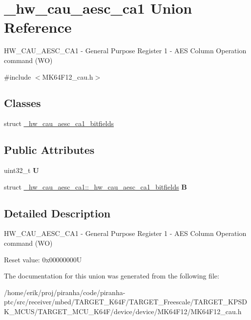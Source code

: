 \hypertarget{union__hw__cau__aesc__ca1}{}\section{\+\_\+hw\+\_\+cau\+\_\+aesc\+\_\+ca1 Union Reference}
\label{union__hw__cau__aesc__ca1}


H\+W\+\_\+\+C\+A\+U\+\_\+\+A\+E\+S\+C\+\_\+\+C\+A1 -\/ General Purpose Register 1 -\/ A\+ES Column Operation command (WO)  




{\ttfamily \#include $<$M\+K64\+F12\+\_\+cau.\+h$>$}

\subsection*{Classes}
\begin{DoxyCompactItemize}
\item 
struct \hyperlink{struct__hw__cau__aesc__ca1_1_1__hw__cau__aesc__ca1__bitfields}{\+\_\+hw\+\_\+cau\+\_\+aesc\+\_\+ca1\+\_\+bitfields}
\end{DoxyCompactItemize}
\subsection*{Public Attributes}
\begin{DoxyCompactItemize}
\item 
uint32\+\_\+t {\bfseries U}\hypertarget{union__hw__cau__aesc__ca1_a5f38153da5ff92b80a637e80c4100a1c}{}\label{union__hw__cau__aesc__ca1_a5f38153da5ff92b80a637e80c4100a1c}

\item 
struct \hyperlink{struct__hw__cau__aesc__ca1_1_1__hw__cau__aesc__ca1__bitfields}{\+\_\+hw\+\_\+cau\+\_\+aesc\+\_\+ca1\+::\+\_\+hw\+\_\+cau\+\_\+aesc\+\_\+ca1\+\_\+bitfields} {\bfseries B}\hypertarget{union__hw__cau__aesc__ca1_ac384c6fb45af31089286582991931284}{}\label{union__hw__cau__aesc__ca1_ac384c6fb45af31089286582991931284}

\end{DoxyCompactItemize}


\subsection{Detailed Description}
H\+W\+\_\+\+C\+A\+U\+\_\+\+A\+E\+S\+C\+\_\+\+C\+A1 -\/ General Purpose Register 1 -\/ A\+ES Column Operation command (WO) 

Reset value\+: 0x00000000U 

The documentation for this union was generated from the following file\+:\begin{DoxyCompactItemize}
\item 
/home/erik/proj/piranha/code/piranha-\/ptc/src/receiver/mbed/\+T\+A\+R\+G\+E\+T\+\_\+\+K64\+F/\+T\+A\+R\+G\+E\+T\+\_\+\+Freescale/\+T\+A\+R\+G\+E\+T\+\_\+\+K\+P\+S\+D\+K\+\_\+\+M\+C\+U\+S/\+T\+A\+R\+G\+E\+T\+\_\+\+M\+C\+U\+\_\+\+K64\+F/device/device/\+M\+K64\+F12/M\+K64\+F12\+\_\+cau.\+h\end{DoxyCompactItemize}
